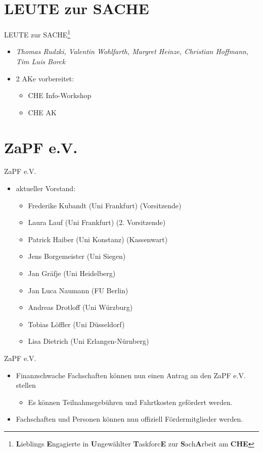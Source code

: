 \documentclass[compress, aspectratio=169]{beamer}
\begin{document}
\section{LEUTE zur SACHE}

\begin{frame}{LEUTE zur SACHE\footnote{\textbf{L}ieblings \textbf{E}ngagierte in \textbf{U}ngewählter \textbf{T}askforc\textbf{E} zur \textbf{S}ach\textbf{A}rbeit am \textbf{CHE}}}
  \begin{itemize}
  \item \emph{Thomas Rudzki, Valentin Wohlfarth, Margret Heinze, Christian Hoffmann, Tim Luis Borck}
  \item 2 AKe vorbereitet: %
    \begin{itemize}
    \item CHE Info-Workshop
    \item CHE AK
    \end{itemize}
  \end{itemize}
\end{frame}

\section{ZaPF e.V.}

\begin{frame}{ZaPF e.V.}
  \begin{itemize}
  \item[] aktueller Vorstand:
    \begin{itemize}
    \item Frederike Kubandt (Uni Frankfurt) (Vorsitzende)
    \item Laura Lauf (Uni Frankfurt) (2. Vorsitzende)
    \item Patrick Haiber (Uni Konstanz) (Kassenwart)
    \item Jens Borgemeister (Uni Siegen)
    \item Jan Gräfje (Uni Heidelberg)
    \item Jan Luca Naumann (FU Berlin)
    \item Andreas Drotloff (Uni Würzburg)
    \item Tobias Löffler (Uni Düsseldorf)
    \item Lisa Dietrich (Uni Erlangen-Nürnberg)
    \end{itemize}
  \end{itemize}
\end{frame} 

\begin{frame}{ZaPF e.V.}
  \begin{itemize}
    \item Finanzschwache Fachschaften können nun einen Antrag an den ZaPF e.V. stellen
      \begin{itemize}
      \item Es können Teilnahmegebühren und Fahrtkosten gefördert werden.
      \end{itemize}
    \item Fachschaften und Personen können nun offiziell Fördermitglieder werden.
  \end{itemize}
\end{frame}
\end{document}
